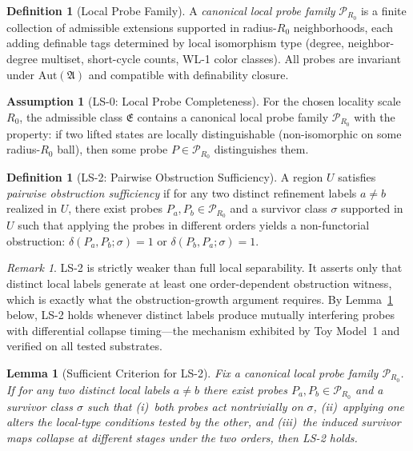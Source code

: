\documentclass[11pt,a4paper]{article}
\newtheorem{lemma}[theorem]{Lemma}
\theoremstyle{definition}
\newtheorem{definition}[theorem]{Definition}
\newtheorem{assumption}[theorem]{Assumption}
\theoremstyle{remark}
\newtheorem{remark}[theorem]{Remark}
\begin{document}
\begin{definition}[Local Probe Family]\label{def:probe}
A \emph{canonical local probe family} $\mathcal{P}_{R_0}$ is a finite collection of admissible extensions supported in radius-$R_0$ neighborhoods, each adding definable tags determined by local isomorphism type (degree, neighbor-degree multiset, short-cycle counts, WL-1 color classes). All probes are invariant under $\mathrm{Aut}(\mathfrak{A})$ and compatible with definability closure.
\end{definition}

\begin{assumption}[LS-0: Local Probe Completeness]\label{ass:LS0}
For the chosen locality scale $R_0$, the admissible class $\mathfrak{E}$ contains a canonical local probe family $\mathcal{P}_{R_0}$ with the property: if two lifted states are locally distinguishable (non-isomorphic on some radius-$R_0$ ball), then some probe $P \in \mathcal{P}_{R_0}$ distinguishes them.
\end{assumption}

\begin{definition}[LS-2: Pairwise Obstruction Sufficiency]\label{def:LS2}
A region $U$ satisfies \emph{pairwise obstruction sufficiency} if for any two distinct refinement labels $a \neq b$ realized in $U$, there exist probes $P_a, P_b \in \mathcal{P}_{R_0}$ and a survivor class $\sigma$ supported in $U$ such that applying the probes in different orders yields a non-functorial obstruction: $\delta(P_a, P_b; \sigma) = 1$ or $\delta(P_b, P_a; \sigma) = 1$.
\end{definition}

\begin{remark}
LS-2 is strictly weaker than full local separability. It asserts only that distinct local labels generate at least one order-dependent obstruction witness, which is exactly what the obstruction-growth argument requires. By Lemma~\ref{lem:LS2-suff} below, LS-2 holds whenever distinct labels produce mutually interfering probes with differential collapse timing---the mechanism exhibited by Toy Model~1 and verified on all tested substrates.
\end{remark}

\begin{lemma}[Sufficient Criterion for LS-2]\label{lem:LS2-suff}
Fix a canonical local probe family $\mathcal{P}_{R_0}$. If for any two distinct local labels $a \neq b$ there exist probes $P_a, P_b \in \mathcal{P}_{R_0}$ and a survivor class $\sigma$ such that (i)~both probes act nontrivially on $\sigma$, (ii)~applying one alters the local-type conditions tested by the other, and (iii)~the induced survivor maps collapse at different stages under the two orders, then LS-2 holds.
\end{lemma}
\end{document}
